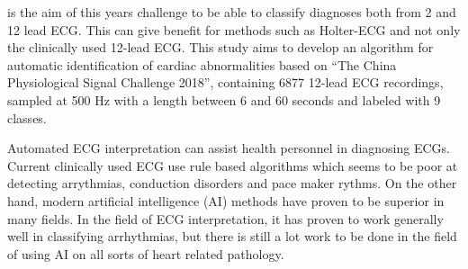 is the aim of this years challenge to be able to classify diagnoses both from 2 and 12 lead ECG. This can give benefit for methods such as Holter-ECG and not only the clinically used 12-lead ECG. 
\newline\indent This study aims to develop an algorithm for automatic identification of cardiac abnormalities based on “The China Physiological Signal Challenge 2018”, containing 6877 12-lead ECG recordings, sampled at 500 Hz with a length between 6 and 60 seconds and labeled with 9 classes.


Automated ECG interpretation can assist health personnel in diagnosing ECGs. Current clinically used ECG use rule based algorithms which seems to be poor at detecting arrythmias, conduction disorders and pace maker rythms. On the other hand, modern artificial intelligence (AI) methods have proven to be superior in many fields. In the field of ECG interpretation, it has proven to work generally well in classifying arrhythmias, but there is still a lot work to be done in the field of using AI on all sorts of heart related pathology.